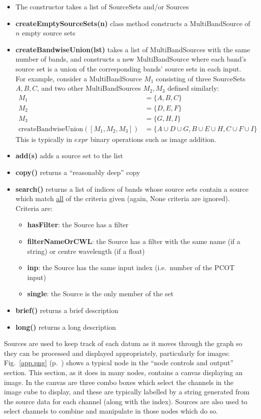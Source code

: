 \begin{itemize}
\item The constructor takes a list of SourceSets and/or Sources
\item \textbf{createEmptySourceSets(n)} class method constructs a MultiBandSource of $n$ empty
source sets
\item \textbf{createBandwiseUnion(lst)} takes a list of MultiBandSources with the same number
of bands, and constructs a new MultiBandSource where each band's source set is a union of
the corresponding bands' source sets in each input. For example, consider a MultiBandSource $M_1$ consisting
of three SourceSets $A, B, C$, and two other MultiBandSources $M_2, M_3$ defined similarly:
\begin{align*}
M_1 &= \{ A, B, C \}\\
M_2 &= \{ D, E, F \}\\
M_3 &= \{ G, H, I \}\\
\text{createBandwiseUnion}([M_1,M_2,M_3]) &= \{ A \cup D \cup G, B \cup E \cup H, C \cup F \cup I\}
\end{align*}
This is typically in $expr$ binary operations such as image addition.
\item \textbf{add(s)} adds a source set to the list
\item \textbf{copy()} returns a ``reasonably deep'' copy
\item \textbf{search()} returns a list of indices of bands whose source sets contain a
source which match \underline{all} of the criteria given (again, None criteria are ignored). Criteria are:
\begin{itemize}
\item \textbf{hasFilter}: the Source has a filter
\item \textbf{filterNameOrCWL}: the Source has a filter with the same name (if a string)
or centre wavelength (if a float)
\item \textbf{inp}: the Source has the same input index (i.e.\ number of the PCOT input)
\item \textbf{single}: the Source is the only member of the set
\end{itemize}
\item \textbf{brief()} returns a brief description
\item \textbf{long()} returns a long description
\end{itemize}

Sources are used to keep track of each datum as it moves through the graph
so they can be processed and displayed appropriately, particularly for images:
Fig.~\ref{app.png} (p.~\pageref{app.png}) shows
a typical node in the ``node controls and output'' section. This section, as
it does in many nodes, contains a canvas displaying an image. In the
canvas are three combo boxes which select the channels in the image cube to
display, and these are typically labelled by a string generated
from the source data for each channel (along with the index). Sources are also
used to select channels to combine and manipulate in those nodes which do so.

